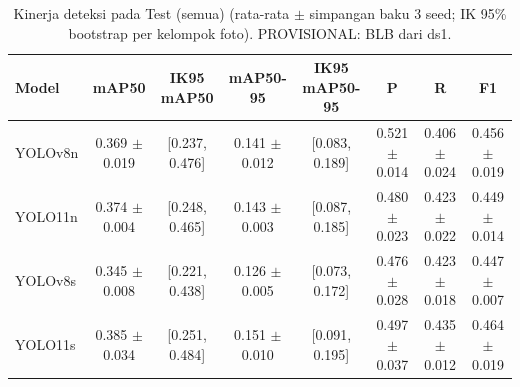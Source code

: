 \begin{table}[!t]
\centering
\caption{Kinerja deteksi pada Test (semua) (rata-rata $\pm$ simpangan baku 3 seed; IK 95\% bootstrap per kelompok foto). PROVISIONAL: BLB dari ds1.}
\label{tab:utama_test_dengan_background}
\footnotesize
\begin{tabular}{lccccccc}
\hline
\textbf{Model} & \textbf{mAP50} & \textbf{IK95 mAP50} & \textbf{mAP50-95} & \textbf{IK95 mAP50-95} & \textbf{P} & \textbf{R} & \textbf{F1} \\
\hline
YOLOv8n & 0.369 $\pm$ 0.019 & [0.237, 0.476] & 0.141 $\pm$ 0.012 & [0.083, 0.189] & 0.521 $\pm$ 0.014 & 0.406 $\pm$ 0.024 & 0.456 $\pm$ 0.019 \\
YOLO11n & 0.374 $\pm$ 0.004 & [0.248, 0.465] & 0.143 $\pm$ 0.003 & [0.087, 0.185] & 0.480 $\pm$ 0.023 & 0.423 $\pm$ 0.022 & 0.449 $\pm$ 0.014 \\
YOLOv8s & 0.345 $\pm$ 0.008 & [0.221, 0.438] & 0.126 $\pm$ 0.005 & [0.073, 0.172] & 0.476 $\pm$ 0.028 & 0.423 $\pm$ 0.018 & 0.447 $\pm$ 0.007 \\
YOLO11s & 0.385 $\pm$ 0.034 & [0.251, 0.484] & 0.151 $\pm$ 0.010 & [0.091, 0.195] & 0.497 $\pm$ 0.037 & 0.435 $\pm$ 0.012 & 0.464 $\pm$ 0.019 \\
\hline
\end{tabular}
\end{table}
